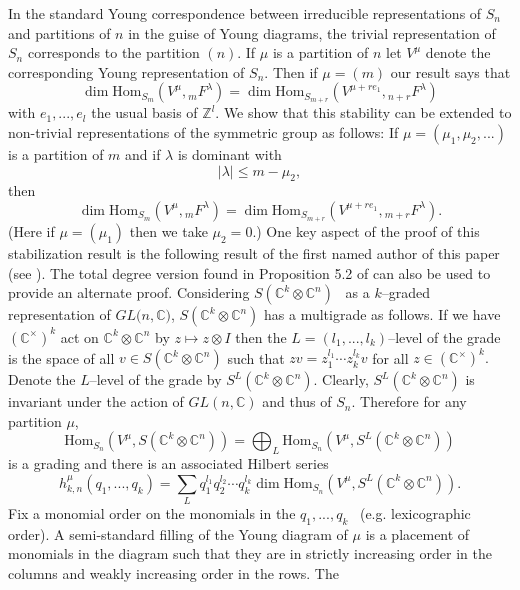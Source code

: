 \documentclass[12pt]{article}%
\begin{document}
In the standard Young correspondence between irreducible representations of
$S_{n}$ and partitions of $n$ in the guise of Young diagrams, the trivial
representation of $S_{n}$ corresponds to the partition $(n)$. If $\mu$ is a
partition of $n$ let $V^{\mu}$ denote the corresponding Young representation
of $S_{n}$. Then if $\mu=(m)$ our result says that
\[
\dim\mathrm{Hom}_{S_{m}}(V^{\mu},{}_{m}F^{\lambda})=\dim\mathrm{Hom}_{S_{m+r}%
}(V^{\mu+re_{1}},{}_{n+r}F^{\lambda})
\]
with $e_{1},...,e_{l}$ the usual basis of $\mathbb{Z}^{l}$. We show that this
stability can be extended to non-trivial representations of the symmetric
group as follows: If $\mu=(\mu_{1},\mu_{2},...)$ is a partition of $m$ and if
$\lambda$ is dominant with
\[
\left\vert \lambda\right\vert \leq m-\mu_{2},
\]
then
\[
\dim\mathrm{Hom}_{S_{m}}(V^{\mu},{}_{m}F^{\lambda})=\dim\mathrm{Hom}_{S_{m+r}%
}(V^{\mu+re_{1}},{}_{m+r}F^{\lambda}).
\]
(Here if $\mu=(\mu_{1})$ then we take $\mu_{2}=0$.) One key aspect of the
proof of this stabilization result is the following result of the first named
author of this paper (see \cite{Rom}). The total degree version found in
Proposition 5.2 of \cite{OZHowe} can also be used to provide an alternate
proof. Considering $S(\mathbb{C}^{k}\otimes\mathbb{C}^{n})$ \ as a
$k$--graded representation of $GL(n,\mathbb{C)}$, $S(\mathbb{C}^{k}%
\otimes\mathbb{C}^{n})$ has a multigrade as follows. If we have $(\mathbb{C}%
^{\times})^{k}$ act on $\mathbb{C}^{k}\otimes\mathbb{C}^{n}$ by $z\mapsto
z\otimes I$ then the $L=(l_{1},...,l_{k})$--level of the grade is the space of
all $v\in S(\mathbb{C}^{k}\otimes\mathbb{C}^{n})$ such that $zv=z_{1}^{l_{1}%
}\cdots z_{k}^{l_{k}}v$ for all $z\in(\mathbb{C}^{\times})^{k}.$ Denote the
$L$--level of the grade by $S^{L}(\mathbb{C}^{k}\otimes\mathbb{C}^{n})$.
Clearly, $S^{L}(\mathbb{C}^{k}\otimes\mathbb{C}^{n})$ is invariant under the
action of $GL(n,\mathbb{C})$ and thus of $S_{n}$. Therefore for any partition
$\mu$,
\[
\mathrm{Hom}_{S_{n}}(V^{\mu},S(\mathbb{C}^{k}\otimes\mathbb{C}^{n}%
))=\bigoplus_{L}\mathrm{Hom}_{S_{n}}(V^{\mu},S^{L}(\mathbb{C}^{k}%
\otimes\mathbb{C}^{n}))
\]
is a grading and there is an associated Hilbert series%
\[
h_{k,n}^{\mu}(q_{1},...,q_{k})=\sum_{L}q_{1}^{l_{1}}q_{2}^{l_{2}}\cdots
q_{k}^{l_{k}}\dim\mathrm{Hom}_{S_{n}}(V^{\mu},S^{L}(\mathbb{C}^{k}%
\otimes\mathbb{C}^{n})).
\]
Fix a monomial order on the monomials in the $q_{1},...,q_{k}$ \ (e.g.
lexicographic order). A semi-standard filling of the Young diagram of $\mu$ is
a placement of monomials in the diagram such that they are in strictly
increasing order in the columns and weakly increasing order in the rows. The
\end{document}
